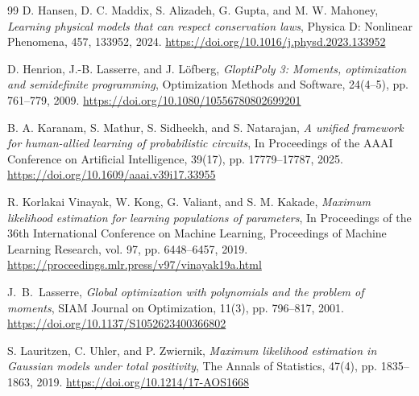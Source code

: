 \documentclass[pdflatex,sn-mathphys-num]{sn-jnl}%
\theoremstyle{thmstyleone}%
\theoremstyle{thmstyletwo}%
\theoremstyle{thmstylethree}%
\begin{document}
\begin{thebibliography}{99}
{\sc D. Hansen, D. C. Maddix, S. Alizadeh, G. Gupta, and M. W. Mahoney},
{\em Learning physical models that can respect conservation laws},
Physica D: Nonlinear Phenomena, 457, 133952, 2024.
\url{https://doi.org/10.1016/j.physd.2023.133952}




{\sc D. Henrion, J.-B. Lasserre, and J. L\"ofberg},
{\em GloptiPoly 3: Moments, optimization and semidefinite programming},
Optimization Methods and Software, 24(4--5), pp. 761--779, 2009.
\url{https://doi.org/10.1080/10556780802699201}

{\sc B. A. Karanam, S. Mathur, S. Sidheekh, and S. Natarajan},
{\em A unified framework for human-allied learning of probabilistic circuits}, In Proceedings of the AAAI Conference on Artificial Intelligence, 39(17), pp. 17779--17787, 2025.
\url{https://doi.org/10.1609/aaai.v39i17.33955}

{\sc R. Korlakai Vinayak, W. Kong, G. Valiant, and S. M. Kakade},
{\em Maximum likelihood estimation for learning populations of parameters},
In Proceedings of the 36th International Conference on Machine Learning,
Proceedings of Machine Learning Research, vol. 97,
pp. 6448--6457, 2019.
\url{https://proceedings.mlr.press/v97/vinayak19a.html}




{\sc J.~B.~Lasserre}, {\em Global optimization with polynomials and the problem of moments}, SIAM Journal on Optimization, 11(3), pp. 796--817, 2001.
\url{https://doi.org/10.1137/S1052623400366802}

{\sc S. Lauritzen, C. Uhler, and P. Zwiernik},
{\em Maximum likelihood estimation in Gaussian models under total positivity},
The Annals of Statistics, 47(4), pp. 1835--1863, 2019.
\url{https://doi.org/10.1214/17-AOS1668}




\end{thebibliography}
\end{document}
